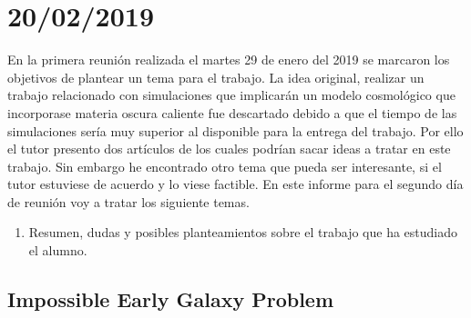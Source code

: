 \section*{20/02/2019}
En la primera reunión realizada el martes 29 de enero del 2019 se marcaron los objetivos de plantear un tema para el trabajo. La idea original, realizar un trabajo relacionado con simulaciones que implicarán un modelo cosmológico que incorporase materia oscura caliente fue descartado debido a que el tiempo de las simulaciones sería muy superior al disponible para la entrega del trabajo. Por ello el tutor presento dos artículos de los cuales podrían sacar ideas a tratar en este trabajo. Sin embargo he encontrado otro tema que pueda ser interesante, si el tutor estuviese de acuerdo y lo viese factible. En este informe para el segundo día de reunión voy a tratar los siguiente temas.
\begin{enumerate}
\item Resumen, dudas y posibles planteamientos sobre el trabajo que ha estudiado el alumno.
\end{enumerate}

\subsection*{Impossible Early Galaxy Problem}
